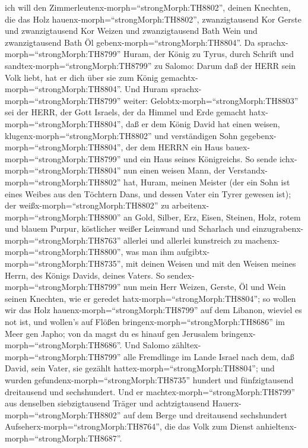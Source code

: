 ich will den Zimmerleutenx-morph=``strongMorph:TH8802'', deinen
Knechten, die das Holz hauenx-morph=``strongMorph:TH8802'',
zwanzigtausend Kor Gerste und zwanzigtausend Kor Weizen und
zwanzigtausend Bath Wein und zwanzigtausend Bath Öl
gebenx-morph=``strongMorph:TH8804''.  Da
sprachx-morph=``strongMorph:TH8799'' Huram, der König zu Tyrus, durch
Schrift und sandtex-morph=``strongMorph:TH8799'' zu Salomo: Darum daß
der HERR sein Volk liebt, hat er dich über sie zum König
gemachtx-morph=``strongMorph:TH8804''.  Und Huram
sprachx-morph=``strongMorph:TH8799'' weiter:
Gelobtx-morph=``strongMorph:TH8803'' sei der HERR, der Gott Israels, der
da Himmel und Erde gemacht hatx-morph=``strongMorph:TH8804'', daß er dem
König David hat einen weisen, klugenx-morph=``strongMorph:TH8802'' und
verständigen Sohn gegebenx-morph=``strongMorph:TH8804'', der dem HERRN
ein Haus bauex-morph=``strongMorph:TH8799'' und ein Haus seines
Königreichs.  So sende ichx-morph=``strongMorph:TH8804''
nun einen weisen Mann, der Verstandx-morph=``strongMorph:TH8802'' hat,
Huram, meinen Meister  (der ein Sohn ist eines Weibes aus
den Töchtern Dans, und dessen Vater ein Tyrer gewesen ist); der
weißx-morph=``strongMorph:TH8802'' zu
arbeitenx-morph=``strongMorph:TH8800'' an Gold, Silber, Erz, Eisen,
Steinen, Holz, rotem und blauem Purpur, köstlicher weißer Leinwand und
Scharlach und einzugrabenx-morph=``strongMorph:TH8763'' allerlei und
allerlei kunstreich zu machenx-morph=``strongMorph:TH8800'', was man ihm
aufgibtx-morph=``strongMorph:TH8735'', mit deinen Weisen und mit den
Weisen meines Herrn, des Königs Davids, deines Vaters.  So
sendex-morph=``strongMorph:TH8799'' nun mein Herr Weizen, Gerste, Öl und
Wein seinen Knechten, wie er geredet hatx-morph=``strongMorph:TH8804'';
 so wollen wir das Holz hauenx-morph=``strongMorph:TH8799''
auf dem Libanon, wieviel es not ist, und wollen's auf Flößen
bringenx-morph=``strongMorph:TH8686'' im Meer gen Japho; von da magst du
es hinauf gen Jerusalem bringenx-morph=``strongMorph:TH8686''.
 Und Salomo zähltex-morph=``strongMorph:TH8799'' alle
Fremdlinge im Lande Israel nach dem, daß David, sein Vater, sie gezählt
hattex-morph=``strongMorph:TH8804''; und wurden
gefundenx-morph=``strongMorph:TH8735'' hundert und fünfzigtausend
dreitausend und sechshundert.  Und er
machtex-morph=``strongMorph:TH8799'' aus denselben siebzigtausend Träger
und achtzigtausend Hauerx-morph=``strongMorph:TH8802'' auf dem Berge und
dreitausend sechshundert Aufseherx-morph=``strongMorph:TH8764'', die das
Volk zum Dienst anhieltenx-morph=``strongMorph:TH8687''.


